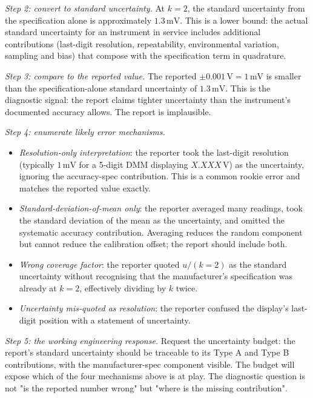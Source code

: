 \emph{Step 2: convert to standard uncertainty.} At $k = 2$, the
standard uncertainty from the specification alone is approximately
$1.3\,\si{\milli\volt}$. This is a lower bound: the actual
standard uncertainty for an instrument in service includes
additional contributions (last-digit resolution, repeatability,
environmental variation, sampling and bias) that compose with the
specification term in quadrature.

\emph{Step 3: compare to the reported value.} The reported
$\pm 0.001\,\si{\volt} = 1\,\si{\milli\volt}$ is smaller than the
specification-alone standard uncertainty of $1.3\,\si{\milli\volt}$.
This is the diagnostic signal: the report claims tighter
uncertainty than the instrument's documented accuracy allows. The
report is implausible.

\emph{Step 4: enumerate likely error mechanisms.}
\begin{itemize}[leftmargin=*]
  \item \emph{Resolution-only interpretation}: the reporter took
    the last-digit resolution (typically $1\,\si{\milli\volt}$ for
    a 5-digit DMM displaying $X.XXX\,\si{\volt}$) as the
    uncertainty, ignoring the accuracy-spec contribution. This is
    a common rookie error and matches the reported value exactly.
  \item \emph{Standard-deviation-of-mean only}: the reporter
    averaged many readings, took the standard deviation of the
    mean as the uncertainty, and omitted the systematic accuracy
    contribution. Averaging reduces the random component but
    cannot reduce the calibration offset; the report should include
    both.
  \item \emph{Wrong coverage factor}: the reporter quoted
    $u/(k=2)$ as the standard uncertainty without recognising
    that the manufacturer's specification was already at $k = 2$,
    effectively dividing by $k$ twice.
  \item \emph{Uncertainty mis-quoted as resolution}: the reporter
    confused the display's last-digit position with a statement of
    uncertainty.
\end{itemize}

\emph{Step 5: the working engineering response.} Request the
uncertainty budget: the report's standard uncertainty should be
traceable to its Type A and Type B contributions, with the
manufacturer-spec component visible. The budget will expose which
of the four mechanisms above is at play. The diagnostic question is
not "is the reported number wrong" but "where is the missing
contribution".

